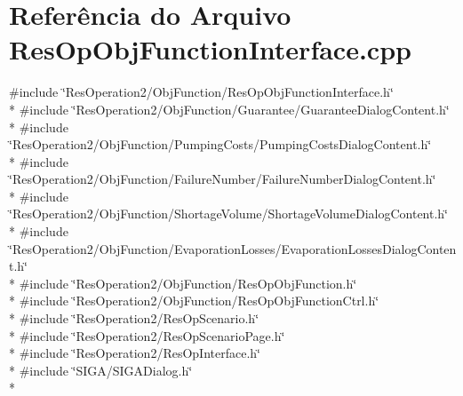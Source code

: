 \section{Referência do Arquivo Res\+Op\+Obj\+Function\+Interface.\+cpp}
\label{_2_obj_function_2_res_op_obj_function_interface_8cpp}
{\ttfamily \#include \char`\"{}Res\+Operation2/\+Obj\+Function/\+Res\+Op\+Obj\+Function\+Interface.\+h\char`\"{}}\\*
{\ttfamily \#include \char`\"{}Res\+Operation2/\+Obj\+Function/\+Guarantee/\+Guarantee\+Dialog\+Content.\+h\char`\"{}}\\*
{\ttfamily \#include \char`\"{}Res\+Operation2/\+Obj\+Function/\+Pumping\+Costs/\+Pumping\+Costs\+Dialog\+Content.\+h\char`\"{}}\\*
{\ttfamily \#include \char`\"{}Res\+Operation2/\+Obj\+Function/\+Failure\+Number/\+Failure\+Number\+Dialog\+Content.\+h\char`\"{}}\\*
{\ttfamily \#include \char`\"{}Res\+Operation2/\+Obj\+Function/\+Shortage\+Volume/\+Shortage\+Volume\+Dialog\+Content.\+h\char`\"{}}\\*
{\ttfamily \#include \char`\"{}Res\+Operation2/\+Obj\+Function/\+Evaporation\+Losses/\+Evaporation\+Losses\+Dialog\+Content.\+h\char`\"{}}\\*
{\ttfamily \#include \char`\"{}Res\+Operation2/\+Obj\+Function/\+Res\+Op\+Obj\+Function.\+h\char`\"{}}\\*
{\ttfamily \#include \char`\"{}Res\+Operation2/\+Obj\+Function/\+Res\+Op\+Obj\+Function\+Ctrl.\+h\char`\"{}}\\*
{\ttfamily \#include \char`\"{}Res\+Operation2/\+Res\+Op\+Scenario.\+h\char`\"{}}\\*
{\ttfamily \#include \char`\"{}Res\+Operation2/\+Res\+Op\+Scenario\+Page.\+h\char`\"{}}\\*
{\ttfamily \#include \char`\"{}Res\+Operation2/\+Res\+Op\+Interface.\+h\char`\"{}}\\*
{\ttfamily \#include \char`\"{}S\+I\+G\+A/\+S\+I\+G\+A\+Dialog.\+h\char`\"{}}\\*
